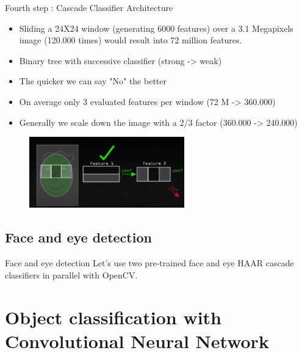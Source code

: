 \documentclass[tikz,table,border=2mm]{beamer}
\begin{document}
\begin{frame}{Fourth step : Cascade Classifier Architecture}
\begin{itemize}

\item Sliding a 24X24 window (generating 6000 features) over a 3.1 Megapixels image (120.000 times) would result into 72 million features.
\item Binary tree with successive classifier (strong -> weak) 
\item The quicker we can say "No" the better
\item On average only 3 evaluated features per window (72 M -> 360.000)
\item Generally we scale down the image with a 2/3 factor (360.000 -> 240.000)
\end{itemize}
\begin{figure}[ht]
    \centering
    \includegraphics[width=0.6\textwidth]{images/haar_comp_1.png}
\end{figure}
\end{frame}


\subsection{Face and eye detection}
\begin{frame}{Face and eye detection}
Let's use two pre-trained face and eye HAAR cascade classifiers in parallel with OpenCV.
\end{frame}

\section{Object classification with Convolutional Neural Network}
\end{document}
